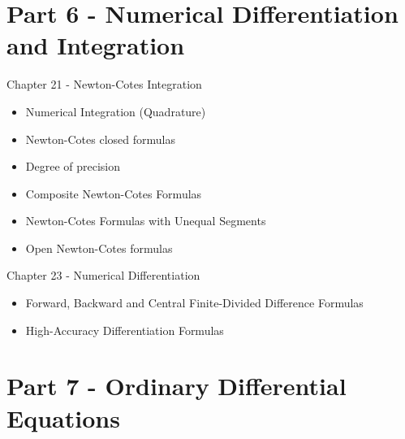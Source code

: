 \documentclass[12pt]{beamer}
\begin{document}
\section{Part 6 - Numerical Differentiation and Integration}

\begin{frame}{Chapter 21 - Newton-Cotes Integration}

\begin{itemize}

\item{Numerical Integration (Quadrature)} 

\item{Newton-Cotes closed formulas} 

\item{Degree of precision} 

\item{Composite Newton-Cotes Formulas} 

\item{Newton-Cotes Formulas with Unequal Segments} 

\item{Open Newton-Cotes formulas} 

\end{itemize}

\end{frame}

\begin{frame}{Chapter 23 - Numerical Differentiation}

\begin{itemize}

\item{Forward, Backward and Central Finite-Divided Difference Formulas} 

\item{High-Accuracy Differentiation Formulas} 


\end{itemize}

\end{frame}

\section{Part 7 - Ordinary Differential Equations}
\end{document}
